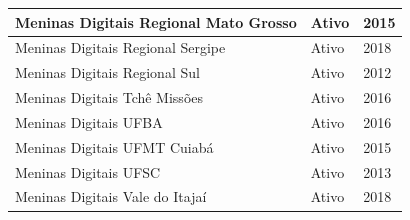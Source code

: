 \begin{longtable}{|l|l|l|}
Meninas Digitais Regional Mato Grosso                                                                                                                       & Ativo                        & 2015                        \\ \hline
  
Meninas Digitais Regional Sergipe                                                                                                                           & Ativo                        & 2018                        \\ \hline
  
Meninas Digitais Regional Sul                                                                                                                               & Ativo                        & 2012                        \\ \hline
  
Meninas Digitais Tchê Missões                                                                                                                               & Ativo                        & 2016                        \\ \hline
Meninas Digitais UFBA                                                                                                                                       & Ativo                        & 2016                        \\ \hline
Meninas Digitais UFMT Cuiabá                                                                                                                                & Ativo                        & 2015                        \\ \hline
  
Meninas Digitais UFSC                                                                                                                                       & Ativo                        & 2013                        \\ \hline
  
Meninas Digitais Vale do Itajaí                                                                                                                             & Ativo                        & 2018                        \\ \hline
  

\end{longtable}
